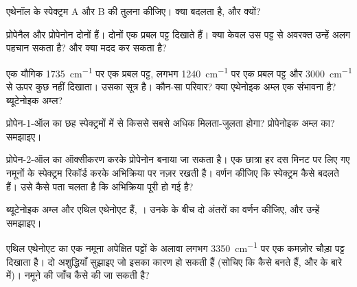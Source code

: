 \begin{exercise}[$\star\star$]\label{exo:g11:infrared:8}
एथेनॉल के स्पेक्ट्रम A और B की तुलना कीजिए। क्या बदलता है, और क्यों?
\end{exercise}

\begin{exercise}[$\star\star$]\label{exo:g11:infrared:9}
प्रोपेनैल और प्रोपेनोन दोनों  हैं। दोनों एक प्रबल 
पट्ट दिखाते हैं। क्या केवल उस पट्ट से अवरक्त उन्हें अलग पहचान सकता है? और क्या
मदद कर सकता है?
\end{exercise}

\begin{exercise}[$\star\star$]\label{exo:g11:infrared:10}
एक यौगिक \qty{1735}{cm^{-1}} पर एक प्रबल पट्ट, लगभग \qty{1240}{cm^{-1}} पर
एक प्रबल पट्ट और \qty{3000}{cm^{-1}} से ऊपर कुछ नहीं दिखाता। उसका सूत्र
 है। कौन-सा परिवार? क्या एथेनोइक अम्ल एक संभावना है? ब्यूटेनोइक
अम्ल?
\end{exercise}

\begin{exercise}[$\star\star$]\label{exo:g11:infrared:11}
प्रोपेन-1-ऑल का  छह स्पेक्ट्रमों में से किससे सबसे अधिक मिलता-जुलता होगा?
प्रोपेनोइक अम्ल का? समझाइए।
\end{exercise}

\begin{exercise}[$\star\star\star$]\label{exo:g11:infrared:12}
प्रोपेन-2-ऑल का ऑक्सीकरण करके प्रोपेनोन बनाया जा सकता है। एक छात्रा हर दस मिनट पर
लिए गए नमूनों के स्पेक्ट्रम रिकॉर्ड करके अभिक्रिया पर नज़र रखती है।
वर्णन कीजिए कि स्पेक्ट्रम कैसे बदलते हैं। उसे कैसे पता चलता है कि अभिक्रिया
पूरी हो गई है?
\end{exercise}

\begin{exercise}[$\star\star\star$]\label{exo:g11:infrared:13}
ब्यूटेनोइक अम्ल और एथिल एथेनोएट  हैं, । उनके 
के बीच दो अंतरों का वर्णन कीजिए, और उन्हें समझाइए।
\end{exercise}

\begin{exercise}[$\star\star\star$]\label{exo:g11:infrared:14}
एथिल एथेनोएट का एक नमूना अपेक्षित पट्टों के अलावा लगभग \qty{3350}{cm^{-1}} पर
एक कमज़ोर चौड़ा पट्ट दिखाता है। दो अशुद्धियाँ सुझाइए जो इसका कारण हो सकती हैं
(सोचिए कि  कैसे बनते हैं, और  के बारे में)। नमूने की जाँच कैसे
की जा सकती है?
\end{exercise}


